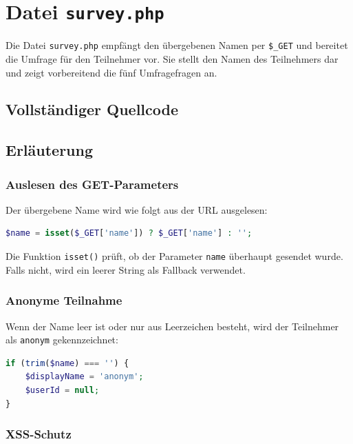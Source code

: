 \section{Datei \texttt{survey.php}}

Die Datei \texttt{survey.php} empfängt den übergebenen Namen per \texttt{\$\_GET} und bereitet die Umfrage für den Teilnehmer vor. Sie stellt den Namen des Teilnehmers dar und zeigt vorbereitend die fünf Umfragefragen an.

\subsection{Vollständiger Quellcode}



\subsection{Erläuterung}

\subsubsection{Auslesen des GET-Parameters}

Der übergebene Name wird wie folgt aus der \acs{URL} ausgelesen:

\begin{lstlisting}[language=php]
$name = isset($_GET['name']) ? $_GET['name'] : '';
\end{lstlisting}

Die Funktion \texttt{isset()} prüft, ob der Parameter \texttt{name} überhaupt gesendet wurde. Falls nicht, wird ein leerer String als Fallback verwendet.

\subsubsection{Anonyme Teilnahme}

Wenn der Name leer ist oder nur aus Leerzeichen besteht, wird der Teilnehmer als \texttt{anonym} gekennzeichnet:

\begin{lstlisting}[language=php]
if (trim($name) === '') {
    $displayName = 'anonym';
    $userId = null;
}
\end{lstlisting}

\subsubsection{\acs{XSS}-Schutz}

